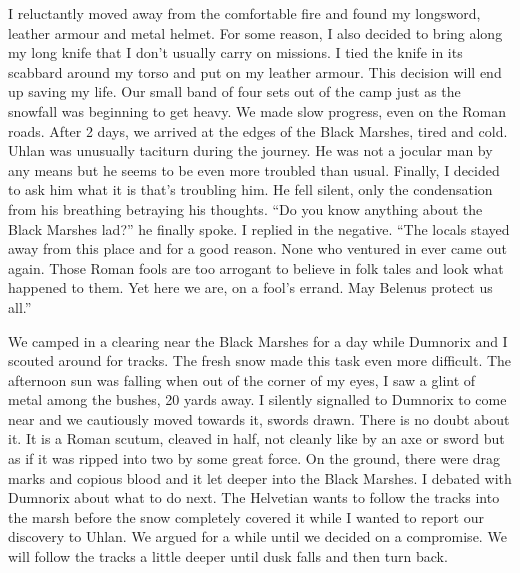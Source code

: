 I reluctantly moved away from the comfortable fire and found my
longsword, leather armour and metal helmet. For some reason, I also
decided to bring along my long knife that I don't usually
carry on missions. I tied the knife in its scabbard around my torso
and put on my leather armour. This decision will end up saving my
life. Our small band of four sets out of the camp just as the
snowfall was beginning to get heavy. We made slow progress, even on
the Roman roads. After 2 days, we arrived at the edges of the Black
Marshes, tired and cold. Uhlan was unusually taciturn during the
journey. He was not a jocular man by any means but he seems to be
even more troubled than usual. Finally, I decided to ask him what
it is that's troubling him. He fell silent, only the
condensation from his breathing betraying his thoughts. ``Do
you know anything about the Black Marshes lad?'' he finally
spoke. I replied in the negative. ``The locals stayed away
from this place and for a good reason. None who ventured in ever
came out again. Those Roman fools are too arrogant to believe in
folk tales and look what happened to them. Yet here we are, on a
fool's errand. May Belenus protect us all.''



We camped in a clearing near the Black Marshes for a day while
Dumnorix and I scouted around for tracks. The fresh snow made this
task even more difficult. The afternoon sun was falling when out of
the corner of my eyes, I saw a glint of metal among the bushes, 20
yards away. I silently signalled to Dumnorix to come near and we
cautiously moved towards it, swords drawn. There is no doubt about
it. It is a Roman scutum, cleaved in half, not cleanly like by an
axe or sword but as if it was ripped into two by some great force.
On the ground, there were drag marks and copious blood and it let
deeper into the Black Marshes. I debated with Dumnorix about what
to do next. The Helvetian wants to follow the tracks into the marsh
before the snow completely covered it while I wanted to report our
discovery to Uhlan. We argued for a while until we decided on a
compromise. We will follow the tracks a little deeper until dusk
falls and then turn back.



